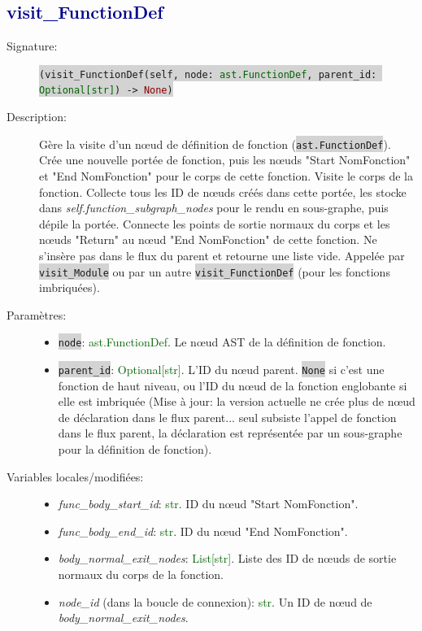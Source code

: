 \documentclass[11pt,a4paper]{article}
\newcommand{\code}[1]{\colorbox{lightgray}{\texttt{\small #1}}}
\newcommand{\var}[1]{\textit{#1}}
\newcommand{\vartype}[1]{\textcolor{darkgreen}{#1}}
\newcommand{\methodname}[1]{\textbf{\textcolor{darkblue}{#1}}}
\newcommand{\param}[1]{\code{#1}}
\newcommand{\rettype}[1]{\textcolor{darkred}{#1}}
\begin{document}
\subsection*{\methodname{visit\_FunctionDef}}
\begin{description}
    \item[Signature:] \code{(visit\_FunctionDef(self, node: \vartype{ast.FunctionDef}, parent\_id: \vartype{Optional[str]}) -> \rettype{None})}
    \item[Description:] Gère la visite d'un nœud de définition de fonction (\code{ast.FunctionDef}). Crée une nouvelle portée de fonction, puis les nœuds "Start NomFonction" et "End NomFonction" pour le corps de cette fonction. Visite le corps de la fonction. Collecte tous les ID de nœuds créés dans cette portée, les stocke dans \var{self.function\_subgraph\_nodes} pour le rendu en sous-graphe, puis dépile la portée. Connecte les points de sortie normaux du corps et les nœuds "Return" au nœud "End NomFonction" de cette fonction. Ne s'insère pas dans le flux du parent et retourne une liste vide. Appelée par \code{visit\_Module} ou par un autre \code{visit\_FunctionDef} (pour les fonctions imbriquées).
    \item[Paramètres:]
    \begin{itemize}
        \item \param{node}: \vartype{ast.FunctionDef}. Le nœud AST de la définition de fonction.
        \item \param{parent\_id}: \vartype{Optional[str]}. L'ID du nœud parent. \code{None} si c'est une fonction de haut niveau, ou l'ID du nœud de la fonction englobante si elle est imbriquée (Mise à jour: la version actuelle ne crée plus de nœud de déclaration dans le flux parent... seul subsiste l'appel de fonction dans le flux parent, la déclaration est représentée par un sous-graphe pour la définition de fonction).
    \end{itemize}
    \item[Variables locales/modifiées:]
    \begin{itemize}
        \item \var{func\_body\_start\_id}: \vartype{str}. ID du nœud "Start NomFonction".
        \item \var{func\_body\_end\_id}: \vartype{str}. ID du nœud "End NomFonction".
        \item \var{body\_normal\_exit\_nodes}: \vartype{List[str]}. Liste des ID de nœuds de sortie normaux du corps de la fonction.
        \item \var{node\_id} (dans la boucle de connexion): \vartype{str}. Un ID de nœud de \var{body\_normal\_exit\_nodes}.

\end{itemize}
\end{description}
\end{document}
